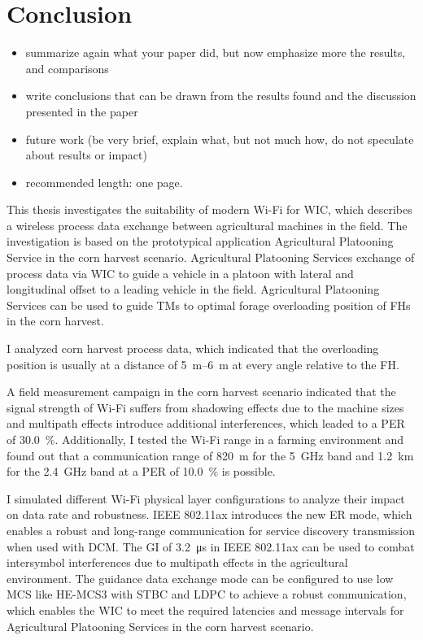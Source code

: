 \chapter{Conclusion}
\acresetall

\begin{itemize}
\item summarize again what your paper did, but now emphasize more the results, and comparisons
\item write conclusions that can be drawn from the results found and the discussion presented in the paper
\item future work (be very brief, explain what, but not much how, do not speculate about results or impact)
\item recommended length: one page.
\end{itemize}
This thesis investigates the suitability of modern Wi-Fi for \ac{WIC}, which describes a wireless process data exchange between agricultural machines in the field.
The investigation is based on the prototypical application Agricultural Platooning Service in the corn harvest scenario.
Agricultural Platooning Services exchange of process data via \ac{WIC} to guide a vehicle in a platoon with lateral and longitudinal
offset to a leading vehicle in the field.
Agricultural Platooning Services can be used to guide \ac{TM}s to optimal forage overloading position of \ac{FH}s in the corn harvest.

I analyzed corn harvest process data, which indicated that the overloading position is usually at a distance of \SIrange{5}{6}{\meter} at every angle relative to the \ac{FH}.

A field measurement campaign in the corn harvest scenario indicated that the signal strength of Wi-Fi suffers from shadowing effects due to the machine sizes and
multipath effects introduce additional interferences, which leaded to a \ac{PER} of \SI{30.0}{\percent}.
Additionally, I tested the Wi-Fi range in a farming environment and found out that a communication range of \SI{820}{\meter} for the \SI{5}{\giga\hertz} band and \SI{1.2}{\kilo\meter} for the \SI{2.4}{\giga\hertz} band
at a \ac{PER} of \SI{10.0}{\percent} is possible. 

I simulated different Wi-Fi physical layer configurations to analyze their impact on data rate and robustness.
IEEE 802.11ax introduces the new \ac{ER} mode, which enables a robust and long-range communication for service discovery transmission when used with \ac{DCM}.
The \ac{GI} of \SI{3.2}{\micro\second} in IEEE 802.11ax can be used to combat intersymbol interferences due to multipath effects in the agricultural environment.
The guidance data exchange mode can be configured to use low \ac{MCS} like \ac{HE}-\ac{MCS}3 with \ac{STBC} and \ac{LDPC} to achieve a robust communication,
which enables the \ac{WIC} to meet the required latencies and message intervals for Agricultural Platooning Services in the corn harvest scenario.








